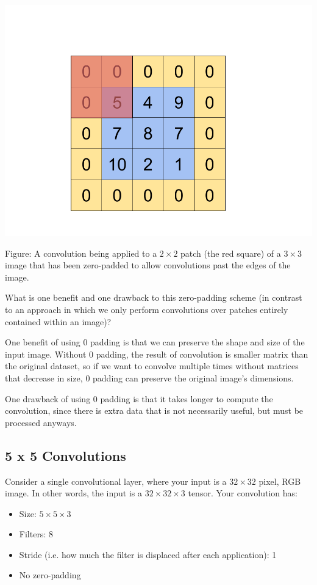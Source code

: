 \begin{center}
    \includegraphics[width=.49\textwidth]{Plots/ConvolutionExample.png}
\end{center}
\begin{small}
Figure: A convolution being applied to a $2 \times 2$ patch (the red square) of a $3 \times 3$ image that has been zero-padded to allow convolutions past the edges of the image.
\end{small}

What is one benefit and one drawback to this zero-padding scheme (in contrast to an approach in which we only perform convolutions over patches entirely contained within an image)?

\begin{solution}
    One benefit of using 0 padding is that we can preserve the shape and size of the input image. Without 0 padding, the result of convolution is smaller matrix than the original dataset, so if we want to convolve multiple times without matrices that decrease in size, 0 padding can preserve the original image's dimensions.

    One drawback of using 0 padding is that it takes longer to compute the convolution, since there is extra data that is not necessarily useful, but must be processed anyways.
\end{solution}

\subsection{5 x 5 Convolutions}

Consider a single convolutional layer, where your input is a $32 \times 32$ pixel, RGB image. In other words, the input is a $32 \times 32 \times 3$ tensor. Your convolution has:

\begin{itemize}
\item Size: $5 \times 5 \times 3$
\item Filters: 8
\item Stride (i.e. how much the filter is displaced after each application): 1
\item No zero-padding
\end{itemize}

